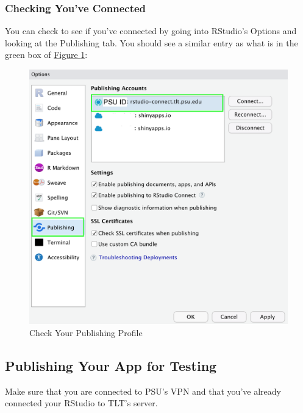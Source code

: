 \documentclass[
]{book}
\begin{document}
\hypertarget{checking-youve-connected}{%
\subsubsection{Checking You've Connected}\label{checking-youve-connected}}

You can check to see if you've connected by going into RStudio's Options and looking at the Publishing tab. You should see a similar entry as what is in the green box of \protect\hyperlink{fig:testing2}{Figure \ref{fig:testing2}}:

\begin{figure}

{\centering \includegraphics[width=17.78in]{images/publish2} 

}

\caption{Check Your Publishing Profile}\label{fig:testing2}
\end{figure}

\hypertarget{publishing-your-app-for-testing}{%
\subsection{Publishing Your App for Testing}\label{publishing-your-app-for-testing}}

Make sure that you are connected to PSU's VPN and that you've already connected your RStudio to TLT's server.
\end{document}

